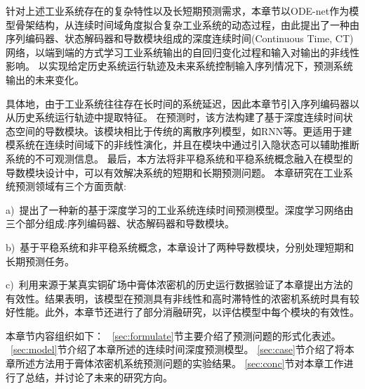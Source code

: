 针对上述工业系统存在的复杂特性以及长短期预测需求，本章节以ODE-net作为模型骨架结构，从连续时间域角度拟合复杂工业系统的动态过程，由此提出了一种由序列编码器、状态解码器和导数模块组成的深度连续时间(Continuous Time, CT)网络，以端到端的方式学习工业系统输出的自回归变化过程和输入对输出的非线性影响。
以实现给定历史系统运行轨迹及未来系统控制输入序列情况下，预测系统输出的未来变化。

具体地，由于工业系统往往存在长时间的系统延迟，因此本章节引入序列编码器以从历史系统运行轨迹中提取特征。
在预测时，该方法构建了基于深度连续时间状态空间的导数模块。该模块相比于传统的离散序列模型，如RNN等。更适用于建模系统在连续时间域下的非线性演化，并且在模块中通过引入隐状态可以辅助推断系统的不可观测信息。
最后，本方法将非平稳系统和平稳系统概念融入在模型的导数模块设计中，可以有效解决系统的短期和长期预测问题。
本章研究在工业系统预测领域有三个方面贡献:

a)\ 提出了一种新的基于深度学习的工业系统连续时间预测模型。深度学习网络由三个部分组成:序列编码器、状态解码器和导数模块。

b)\ 基于平稳系统和非平稳系统概念，本章设计了两种导数模块，分别处理短期和长期预测任务。

c)\ 利用来源于某真实铜矿场中膏体浓密机的历史运行数据验证了本章提出方法的有效性。结果表明，该模型在预测具有非线性和高时滞特性的浓密机系统时具有较好性能。此外，本章节还进行了部分消融研究，以评估模型中每个模块的有效性。

本章节内容组织如下：
~\ref{sec:formulate}节主要介绍了预测问题的形式化表述。
~\ref{sec:model}节介绍了本章所述的连续时间深度预测模型。
\ref{sec:case}节介绍了将本章所述方法用于膏体浓密机系统预测问题的实验结果。
\ref{sec:conc}节对本章工作进行了总结，并讨论了未来的研究方向。

